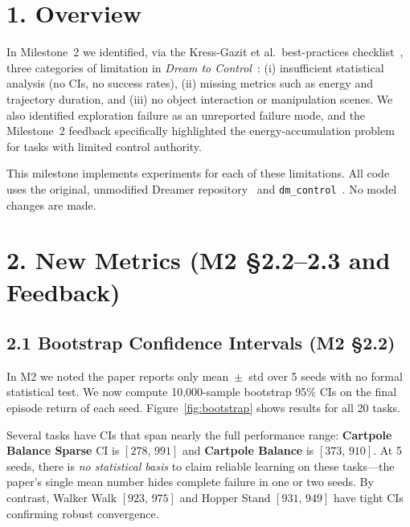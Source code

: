 \documentclass[10pt,twocolumn]{article}
\begin{document}

\section{1. Overview}

In Milestone~2 we identified, via the Kress-Gazit et al.\
best-practices checklist~\cite{bestpractices}, three categories of
limitation in \textit{Dream to Control}~\cite{dreamer}: (i)
insufficient statistical analysis (no CIs, no success rates), (ii)
missing metrics such as energy and trajectory duration, and (iii)
no object interaction or manipulation scenes.  We also identified
exploration failure as an unreported failure mode, and the Milestone~2
feedback specifically highlighted the energy-accumulation problem
for tasks with limited control authority.

This milestone implements experiments for each of these
limitations.  All code uses the original, unmodified Dreamer
repository~\cite{dreamer} and \texttt{dm\_control}~\cite{dmcontrol}.
No model changes are made.

\section{2. New Metrics (M2 \S2.2--2.3 and Feedback)}

\subsection{2.1 Bootstrap Confidence Intervals (M2 \S2.2)}

In M2 we noted the paper reports only mean~$\pm$~std over 5 seeds
with no formal statistical test.  We now compute 10{,}000-sample
bootstrap 95\% CIs on the final episode return of each seed.
Figure~\ref{fig:bootstrap} shows results for all 20 tasks.

Several tasks have CIs that span nearly the full performance range:
\textbf{Cartpole Balance Sparse} CI is $[278,\,991]$ and
\textbf{Cartpole Balance} is $[373,\,910]$.  At 5 seeds, there is
\textit{no statistical basis} to claim reliable learning on these
tasks---the paper's single mean number hides complete failure in
one or two seeds.  By contrast, Walker Walk $[923,\,975]$ and
Hopper Stand $[931,\,949]$ have tight CIs confirming robust
convergence.
\end{document}
